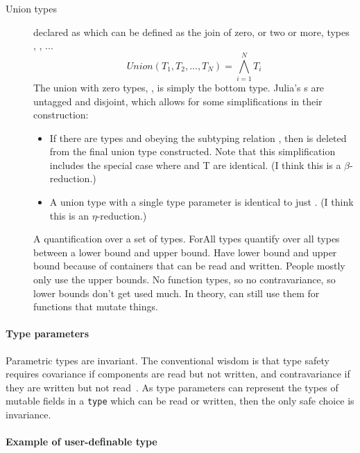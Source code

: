 \documentclass[pldi]{sigplanconf-pldi15}
\begin{document}
\begin{description}
\item[Union types] declared as  which can be defined as
	the join of zero, or two or more, types , ,
	...~\cite[Sec.  15.7]{Pierce2002}
	\begin{equation}
		Union(T_1, T_2, ..., T_N) = \bigwedge_{i=1}^N T_i 
	\end{equation}
	The union with zero types, , is simply the bottom type.
	Julia's s are untagged and disjoint, which allows for some
	simplifications in their construction:
	\begin{itemize}
		\item If there are types  and  obeying the
			subtyping relation , then  is
			deleted from the final union type constructed. Note
			that this simplification includes the special case
			where  and \code T are identical.  (I think
			this is a $\beta$-reduction.)

		\item A union type  with a single type parameter
			 is identical to just . (I think this
			is an $\eta$-reduction.)
	\end{itemize}

\item[] A quantification over a set of types.  ForAll types
	quantify over all types between a lower bound and upper bound. Have
	lower bound and upper bound because of containers that can be read and
	written. People mostly only use the upper bounds. No function types, so
	no contravariance, so lower bounds don't get used much. In theory, can
	still use them for functions that mutate things.

\end{description}

\paragraph{Type parameters}

Parametric types are invariant.
The conventional wisdom is that type safety requires covariance if components
are read but not written, and contravariance if they are written but not
read~\cite{Castagna1995}. As type parameters can represent the types of mutable
fields in a \verb|type| which can be read or written, then the only safe choice
is invariance.

\paragraph{Example of user-definable type}
\end{document}
